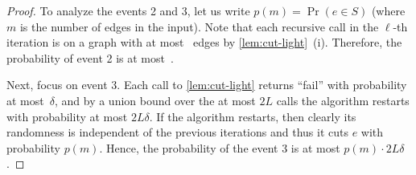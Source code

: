 \documentclass[letterpaper,11pt]{article}
\begin{document}
\begin{proof}
To analyze the events 2 and 3, let us write $p(m) = \Pr(e \in S)$ (where $m$ is the number of edges in the input). Note that each recursive call in the $\ell$-th iteration is on a graph with at most~ edges by \cref{lem:cut-light}~(i). Therefore, the probability of event 2 is at most~.

Next, focus on event 3. Each call to \cref{lem:cut-light} returns ``fail'' with probability at most~$\delta$, and by a union bound over the at most $2L$ calls the algorithm restarts with probability at most $2L\delta$. If the algorithm restarts, then clearly its randomness is independent of the previous iterations and thus it cuts $e$ with probability $p(m)$. Hence, the probability of the event 3 is at most $p(m) \cdot 2L\delta$.


\end{proof}
\end{document}

